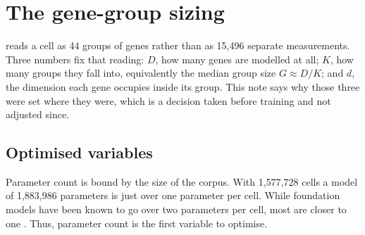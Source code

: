 %
%

\section{The gene-group sizing}
\label{note:grouping}

\elaj{} reads a cell as 44 groups of genes rather than as 15{,}496 separate
measurements. Three numbers fix that reading: $D$, how many genes are modelled
at all; $K$, how many groups they fall into, equivalently the median group size
$G \approx D/K$; and $d$, the dimension each gene occupies inside its group.
This note says why those three were set where they were, which is a decision
taken before training and not adjusted since.

\subsection{Optimised variables}

Parameter count is bound by the size of the corpus. With 1{,}577{,}728 cells 
a model of 1{,}883{,}986 parameters is just over one parameter per cell. 
While foundation models have been known to go over two parameters per cell, 
most are closer to one \citep{hao2024scfoundation,cui2024scgpt,theodoris2023geneformer}. Thus, parameter count is the first variable to 
optimise.

